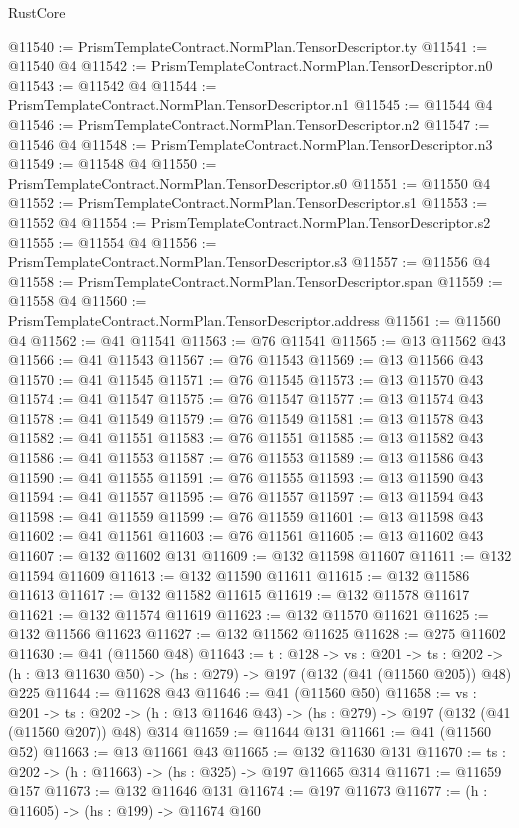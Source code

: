 \begin{lexlean}{RustCore}
\begin{coremodule}
@11540 := PrismTemplateContract.NormPlan.TensorDescriptor.ty
@11541 := @11540 @4
@11542 := PrismTemplateContract.NormPlan.TensorDescriptor.n0
@11543 := @11542 @4
@11544 := PrismTemplateContract.NormPlan.TensorDescriptor.n1
@11545 := @11544 @4
@11546 := PrismTemplateContract.NormPlan.TensorDescriptor.n2
@11547 := @11546 @4
@11548 := PrismTemplateContract.NormPlan.TensorDescriptor.n3
@11549 := @11548 @4
@11550 := PrismTemplateContract.NormPlan.TensorDescriptor.s0
@11551 := @11550 @4
@11552 := PrismTemplateContract.NormPlan.TensorDescriptor.s1
@11553 := @11552 @4
@11554 := PrismTemplateContract.NormPlan.TensorDescriptor.s2
@11555 := @11554 @4
@11556 := PrismTemplateContract.NormPlan.TensorDescriptor.s3
@11557 := @11556 @4
@11558 := PrismTemplateContract.NormPlan.TensorDescriptor.span
@11559 := @11558 @4
@11560 := PrismTemplateContract.NormPlan.TensorDescriptor.address
@11561 := @11560 @4
@11562 := @41 @11541
@11563 := @76 @11541
@11565 := @13 @11562 @43
@11566 := @41 @11543
@11567 := @76 @11543
@11569 := @13 @11566 @43
@11570 := @41 @11545
@11571 := @76 @11545
@11573 := @13 @11570 @43
@11574 := @41 @11547
@11575 := @76 @11547
@11577 := @13 @11574 @43
@11578 := @41 @11549
@11579 := @76 @11549
@11581 := @13 @11578 @43
@11582 := @41 @11551
@11583 := @76 @11551
@11585 := @13 @11582 @43
@11586 := @41 @11553
@11587 := @76 @11553
@11589 := @13 @11586 @43
@11590 := @41 @11555
@11591 := @76 @11555
@11593 := @13 @11590 @43
@11594 := @41 @11557
@11595 := @76 @11557
@11597 := @13 @11594 @43
@11598 := @41 @11559
@11599 := @76 @11559
@11601 := @13 @11598 @43
@11602 := @41 @11561
@11603 := @76 @11561
@11605 := @13 @11602 @43
@11607 := @132 @11602 @131
@11609 := @132 @11598 @11607
@11611 := @132 @11594 @11609
@11613 := @132 @11590 @11611
@11615 := @132 @11586 @11613
@11617 := @132 @11582 @11615
@11619 := @132 @11578 @11617
@11621 := @132 @11574 @11619
@11623 := @132 @11570 @11621
@11625 := @132 @11566 @11623
@11627 := @132 @11562 @11625
@11628 := @275 @11602
@11630 := @41 (@11560 @48)
@11643 := {t : @128} ->
  {vs : @201} ->
  {ts : @202} -> (h : @13 @11630 @50) -> (hs : @279) -> @197 (@132 (@41 (@11560 @205)) @48) @225
@11644 := @11628 @43
@11646 := @41 (@11560 @50)
@11658 := {vs : @201} ->
  {ts : @202} -> (h : @13 @11646 @43) -> (hs : @279) -> @197 (@132 (@41 (@11560 @207)) @48) @314
@11659 := @11644 @131
@11661 := @41 (@11560 @52)
@11663 := @13 @11661 @43
@11665 := @132 @11630 @131
@11670 := {ts : @202} -> (h : @11663) -> (hs : @325) -> @197 @11665 @314
@11671 := @11659 @157
@11673 := @132 @11646 @131
@11674 := @197 @11673
@11677 := (h : @11605) -> (hs : @199) -> @11674 @160

\end{coremodule}
\end{lexlean}

